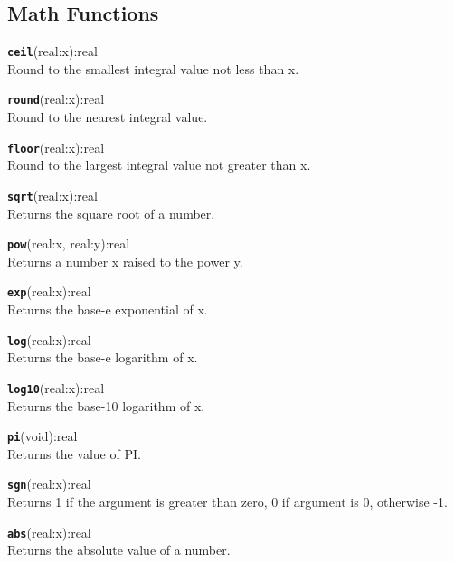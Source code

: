 \subsection{Math Functions}
\texttt{{\large\textbf{ceil}}}\textsf{(real:x):real}\\
 Round to the smallest integral value not less than x.

\hrulefill

\texttt{{\large\textbf{round}}}\textsf{(real:x):real}\\
 Round to the nearest integral value.

\hrulefill

\texttt{{\large\textbf{floor}}}\textsf{(real:x):real}\\
 Round to the largest integral value not greater than x.

\hrulefill

\texttt{{\large\textbf{sqrt}}}\textsf{(real:x):real}\\
 Returns the square root of a number.

\hrulefill

\texttt{{\large\textbf{pow}}}\textsf{(real:x, real:y):real}\\
 Returns a number x raised to the power y.

\hrulefill

\texttt{{\large\textbf{exp}}}\textsf{(real:x):real}\\
 Returns the base-e exponential of x.

\hrulefill

\texttt{{\large\textbf{log}}}\textsf{(real:x):real}\\
 Returns the base-e logarithm of x.

\hrulefill

\texttt{{\large\textbf{log10}}}\textsf{(real:x):real}\\
 Returns the base-10 logarithm of x.

\hrulefill

\texttt{{\large\textbf{pi}}}\textsf{(void):real}\\
 Returns the value of PI.

\hrulefill

\texttt{{\large\textbf{sgn}}}\textsf{(real:x):real}\\
 Returns 1 if the argument is greater than zero, 0 if argument is 0, otherwise -1.

\hrulefill

\texttt{{\large\textbf{abs}}}\textsf{(real:x):real}\\
 Returns the absolute value of a number.

